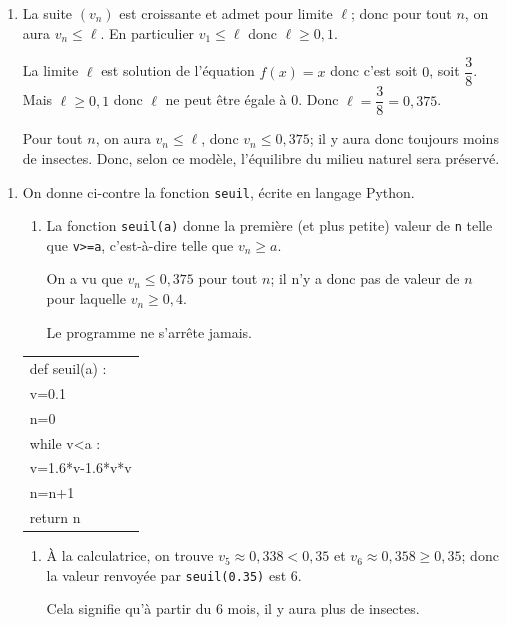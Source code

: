 \begin{enumerate}
\begin{enumerate}
On note $\ell$ la valeur de sa limite. On admet que $\ell$ est solution de l'équation $f(x) = x$.

		\item 
La suite $(v_n)$ est croissante et admet pour limite $\ell$; donc pour tout $n$, on aura $v_n \leqslant \ell$. En particulier $v_1\leqslant \ell$ donc $\ell\geqslant 0,1$.

La limite $\ell$ est solution de l'équation $f(x) = x$ donc c'est soit $0$, soit $\dfrac{3}{8}$. Mais $\ell\geqslant 0,1$ donc $\ell$ ne peut être égale à 0.
Donc $\ell=\dfrac{3}{8}=0,375$.		
		
Pour tout $n$, on aura $v_n\leqslant \ell$, donc $v_n \leqslant 0,375$; il y aura donc toujours moins de  insectes. Donc, selon ce modèle,  l'équilibre du milieu naturel sera préservé.
	\end{enumerate}	
\end{enumerate}

\begin{enumerate}[resume]
\item  On donne ci-contre la fonction \texttt{seuil}, écrite en langage Python.

\begin{minipage}{0.6\linewidth}
	\begin{enumerate}
		\item 
La fonction \texttt{seuil(a)} donne la première (et plus petite) valeur de \texttt{n} telle que \texttt{v>=a}, c'est-à-dire telle que $v_n\geqslant a$.

On a vu que $v_n\leqslant 0,375$ pour tout $n$; il n'y a donc pas de valeur de $n$ pour laquelle $v_n\geqslant 0,4$.

Le programme ne s'arrête jamais.
	\end{enumerate}
\end{minipage}\hfill
\begin{minipage}{0.36\linewidth}
\begin{tabularx}{\linewidth}{|X|}\hline
def seuil(a) :\\
\qquad v=0.1\\
\qquad n=0\\
\qquad while v<a :\\
\qquad \qquad v=1.6*v-1.6*v*v\\
\qquad \qquad n=n+1\\
\qquad return n\\ \hline
\end{tabularx}
\end{minipage}

\begin{enumerate}[resume]
		\item 
À la calculatrice, on trouve $v_5\approx 0,338 <0,35$ et $v_6\approx 0,358 \geqslant 0,35$; donc la valeur renvoyée par \texttt{seuil(0.35)} est 6.
		

Cela signifie qu'à partir du 6\ieme{} mois, il y aura plus de  insectes.
\end{enumerate}	

\end{enumerate}	

\bigskip
